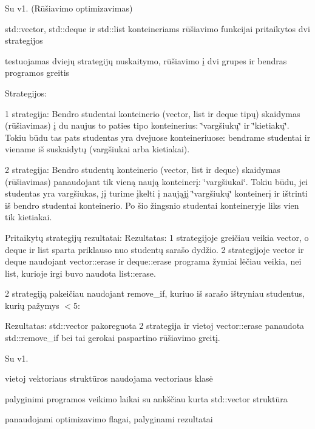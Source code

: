 Su v1. (Rūšiavimo optimizavimas)
\begin{DoxyItemize}
\item std\+::vector, std\+::deque ir std\+::list konteineriams rūšiavimo funkcijai pritaikytos dvi strategijos
\item testuojamas dviejų strategijų nuskaitymo, rūšiavimo į dvi grupes ir bendras programos greitis
\end{DoxyItemize}

Strategijos\+:
\begin{DoxyItemize}
\item 1 strategija\+: Bendro studentai konteinerio (vector, list ir deque tipų) skaidymas (rūšiavimas) į du naujus to paties tipo konteinerius\+: \char`\"{}vargšiukų\char`\"{} ir \char`\"{}kietiakų\char`\"{}. Tokiu būdu tas pats studentas yra dvejuose konteineriuose\+: bendrame studentai ir viename iš suskaidytų (vargšiukai arba kietiakai).
\item 2 strategija\+: Bendro studentų konteinerio (vector, list ir deque) skaidymas (rūšiavimas) panaudojant tik vieną naują konteinerį\+: \char`\"{}vargšiukai\char`\"{}. Tokiu būdu, jei studentas yra vargšiukas, jį turime įkelti į naująjį \char`\"{}vargšiukų\char`\"{} konteinerį ir ištrinti iš bendro studentai konteinerio. Po šio žingsnio studentai konteineryje liks vien tik kietiakai.
\end{DoxyItemize}

Pritaikytų strategijų rezultatai\+:  Rezultatas\+: 1 strategijoje greičiau veikia vector, o deque ir list sparta priklauso nuo studentų sarašo dydžio. 2 strategijoje vector ir deque naudojant vector\+::erase ir deque\+::erase programa žymiai lėčiau veikia, nei list, kurioje irgi buvo naudota list\+::erase.

2 strategiją pakeičiau naudojant remove\+\_\+if, kuriuo iš sarašo ištryniau studentus, kurių pažymys $<$5\+: 

Rezultatas\+: std\+::vector pakoreguota 2 strategija ir vietoj vector\+::erase panaudota std\+::remove\+\_\+if bei tai gerokai paspartino rūšiavimo greitį.

Su v1.
\begin{DoxyItemize}
\item vietoj vektoriaus struktūros naudojama vectoriaus klasė
\item palyginimi programos veikimo laikai su ankščiau kurta std\+::vector struktūra
\item panaudojami optimizavimo flag\textquotesingle{}ai, palyginami rezultatai
\end{DoxyItemize}

